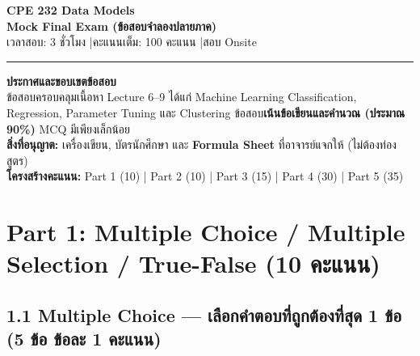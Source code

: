 \documentclass[a4paper,12pt]{article}
\begin{document}
\begin{center}
    \textbf{\Large CPE 232 Data Models}\\[0.2cm]
    \textbf{\large Mock Final Exam (ข้อสอบจำลองปลายภาค)}\\[0.15cm]
    เวลาสอบ: 3 ชั่วโมง \quad|\quad คะแนนเต็ม: 100 คะแนน \quad|\quad สอบ Onsite
\end{center}
\hrule
\vspace{0.35cm}

\noindent\textbf{ประกาศและขอบเขตข้อสอบ}\\
ข้อสอบครอบคลุมเนื้อหา Lecture 6--9 ได้แก่ Machine Learning Classification, Regression, Parameter Tuning และ Clustering
ข้อสอบ\textbf{เน้นข้อเขียนและคำนวณ (ประมาณ 90\%)} MCQ มีเพียงเล็กน้อย\\
\textbf{สิ่งที่อนุญาต:} เครื่องเขียน, บัตรนักศึกษา และ \textbf{Formula Sheet} ที่อาจารย์แจกให้ (ไม่ต้องท่องสูตร)\\
\textbf{โครงสร้างคะแนน:} Part 1 (10) \;|\; Part 2 (10) \;|\; Part 3 (15) \;|\; Part 4 (30) \;|\; Part 5 (35)

\vspace{0.4cm}

\section*{Part 1: Multiple Choice / Multiple Selection / True-False (10 คะแนน)}

\subsection*{1.1 Multiple Choice — เลือกคำตอบที่ถูกต้องที่สุด 1 ข้อ (5 ข้อ ข้อละ 1 คะแนน)}
\end{document}
